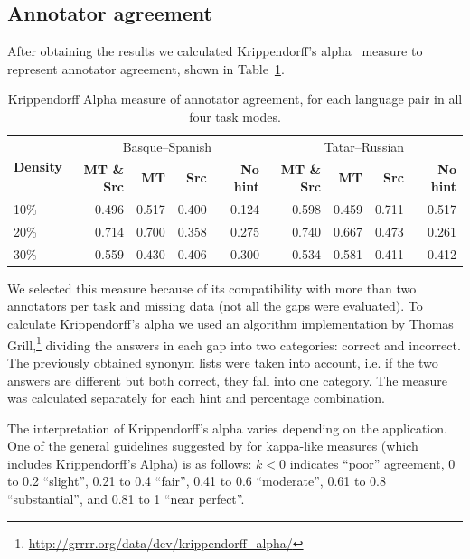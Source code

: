 \documentclass[11pt]{article}
\begin{document}
\subsection{Annotator agreement}
After obtaining the results we calculated Krippendorff's alpha~\citep{krippendorff70} measure to represent annotator agreement, shown in Table~\ref{table:alpha}. 
\begin{table}
\centering
  \begin{tabular}{|l|r|r|r|r|r|r|r|r|}
  \hline
 \multirow{2}{*}{\textbf{Density}} & \multicolumn{4}{|c|}{Basque--Spanish}&\multicolumn{4}{|c|}{Tatar--Russian} \\\cline{2-9}
                                            & \textbf{MT \& Src} & \textbf{MT} & \textbf{Src} & \textbf{No hint}& \textbf{MT \& Src} & \textbf{MT} & \textbf{Src} & \textbf{No hint} \\
\hline
10\%&0.496&0.517&0.400&0.124&0.598&0.459 &0.711 &0.517\\
20\%&0.714&0.700&0.358&0.275&0.740&0.667 &0.473 &0.261\\
30\%&0.559&0.430&0.406&0.300&0.534&0.581 &0.411 &0.412\\

\hline
\end{tabular}
\caption{Krippendorff Alpha measure of annotator agreement, for each language pair in all four task modes.} 
\label{table:alpha}
\end{table}

We selected this measure because of its compatibility with more than two annotators per task and missing data (not all the gaps were evaluated). To calculate Krippendorff's alpha we used an algorithm implementation by Thomas Grill,\footnote{\url{http://grrrr.org/data/dev/krippendorff_alpha/}} dividing the answers in each gap into two categories: correct and incorrect. The previously obtained synonym lists were taken into account, i.e. if the two answers are different but both correct, they fall into one category. The measure was calculated separately for each hint and percentage combination.

The interpretation of Krippendorff's alpha varies depending on the application. One of the general guidelines suggested by \citet{landis77} for kappa-like measures (which includes Krippendorff's Alpha) is as follows: \(k < 0\) indicates ``poor'' agreement, 0 to 0.2 ``slight'', 0.21 to 0.4 ``fair'', 0.41 to 0.6 ``moderate'', 0.61 to 0.8 ``substantial'', and 0.81 to 1 ``near perfect''.
\end{document}
